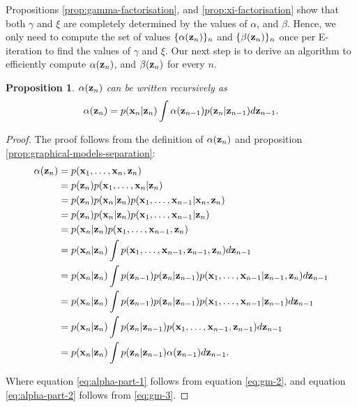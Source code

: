 \documentclass[11pt]{article}
\numberwithin{equation}{section}
\newcommand{\x}{{\bf x}}
\newcommand{\z}{{\bf z}}
\newtheorem{proposition}{Proposition}[section]
\begin{document}
Propositions \ref{prop:gamma-factorisation}, and \ref{prop:xi-factorisation} show that both $\gamma$ and $\xi$ are completely determined by the values of $\alpha$, and $\beta$. Hence, we only need to compute the set of values $\{\alpha(\z_n)\}_n$ and $\{\beta(\z_n)\}_n$ once per E-iteration to find the values of $\gamma$ and $\xi$. Our next step is to derive an algorithm to efficiently compute $\alpha(\z_n)$, and $\beta(\z_n)$ for every $n$.


\begin{proposition} \label{prop:alpha-recursive}
	$\alpha(\z_n)$ can be written recursively as
	\begin{equation}
		\alpha(\z_n) = p(\x_n\vert \z_n) \int \alpha(\z_{n-1})p(\z_n\vert\z_{n-1}) d\z_{n-1}.
	\end{equation}
\end{proposition}

\begin{proof}
	The proof follows from the definition of $\alpha(\z_n)$ and proposition \ref{prop:graphical-models-separation}:
	\begin{align}
		\alpha(\z_n) &= p(\x_1, \ldots, \x_n, \z_n) \\
		&= p(\z_n) p(\x_1, \ldots, \x_n \vert \z_n) \\
		&= p(\z_n) p(\x_n \vert \z_n) p(\x_1, \ldots, \x_{n-1} \vert \x_n, \z_n) \\
		&= p(\z_n) p(\x_n \vert \z_n) p(\x_1, \ldots, \x_{n-1} \vert \z_n) \label{eq:alpha-part-1}\\
		&= p(\x_n \vert \z_n) p(\x_1, \ldots, \x_{n-1}, \z_n) \\
		&= p(\x_n \vert \z_n) \int p(\x_1, \ldots, \x_{n-1}, \z_{n-1}, \z_n) d\z_{n-1}\\
		&= p(\x_n \vert \z_n) \int p(\z_{n-1})p(\z_n \vert \z_{n-1})p(\x_1, \ldots, \x_{n-1} \vert \z_{n-1}, \z_n) d\z_{n-1}\\
		&= p(\x_n \vert \z_n) \int p(\z_{n-1})p(\z_n \vert \z_{n-1})p(\x_1, \ldots, \x_{n-1} \vert \z_{n-1}) d\z_{n-1} \label{eq:alpha-part-2}\\ 
		&= p(\x_n \vert \z_n) \int p(\z_n \vert \z_{n-1})p(\x_1, \ldots, \x_{n-1}, \z_{n-1}) d\z_{n-1}\\
		&= p(\x_n \vert \z_n) \int p(\z_n \vert \z_{n-1})\alpha(\z_{n-1}) d\z_{n-1}.\\
	\end{align}
	
	Where equation \eqref{eq:alpha-part-1} follows from equation \eqref{eq:gm-2}, and equation \eqref{eq:alpha-part-2} follows from \eqref{eq:gm-3}.
\end{proof}
\end{document}
